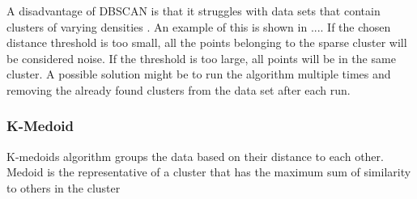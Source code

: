 \documentclass[a4paper, 12pt]{article}
\begin{document}
A disadvantage of DBSCAN is that it struggles with data sets that contain clusters of varying densities \citep{ertoz2003finding}. An example of this is shown in .... If the chosen distance threshold is too small, all the points belonging to the sparse cluster will be considered noise. If the threshold is too large, all points will be in the same cluster. A possible solution might be to run the algorithm multiple times and removing the already found clusters from the data set after each run.

\subsubsection{K-Medoid}
K-medoids algorithm groups the data based on their distance to each other. Medoid is the representative of a cluster that has the maximum sum of similarity to others in the cluster 
\end{document}
